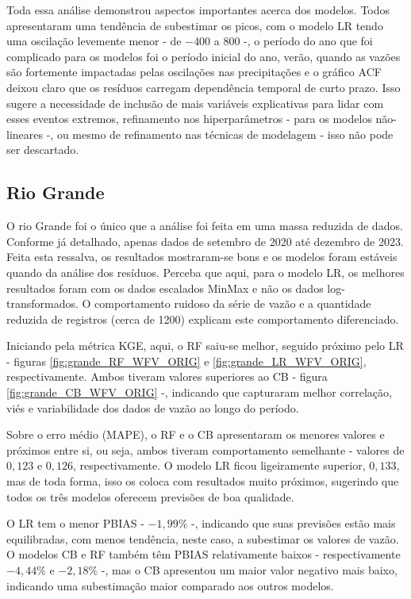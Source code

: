 Toda essa análise demonstrou aspectos importantes acerca dos modelos. Todos apresentaram uma tendência de subestimar os picos, com o modelo LR tendo uma oscilação levemente menor - de $-400$ a $800$ -, o período do ano que foi complicado para os modelos foi o período inicial do ano, verão, quando as vazões são fortemente impactadas pelas oscilações nas precipitações e o gráfico ACF deixou claro que os resíduos carregam dependência temporal de curto prazo. Isso sugere a necessidade de inclusão de mais variáveis explicativas para lidar com esses eventos extremos, refinamento nos hiperparâmetros - para os modelos não-lineares -, ou mesmo de refinamento nas técnicas de modelagem - isso não pode ser descartado.

\clearpage

\subsection{Rio Grande}

O rio Grande foi o único que a análise foi feita em uma massa reduzida de dados. Conforme já detalhado, apenas dados de setembro de 2020 até dezembro de 2023. Feita esta ressalva, os resultados mostraram-se bons e os modelos foram estáveis quando da análise dos resíduos. Perceba que aqui, para o modelo LR, os melhores resultados foram com os dados escalados MinMax e não os dados log-transformados. O comportamento ruidoso da série de vazão e a quantidade reduzida de registros (cerca de 1200) explicam este comportamento diferenciado.

Iniciando pela métrica KGE, aqui, o RF saiu-se melhor, seguido próximo pelo LR - figuras \ref{fig:grande_RF_WFV_ORIG} e \ref{fig:grande_LR_WFV_ORIG}, respectivamente. Ambos tiveram valores superiores ao CB - figura \ref{fig:grande_CB_WFV_ORIG} -, indicando que capturaram melhor correlação, viés e variabilidade dos dados de vazão ao longo do período.

Sobre o erro médio (MAPE), o RF e o CB apresentaram os menores valores e próximos entre si, ou seja, ambos tiveram comportamento semelhante - valores de $0,123$ e $0,126$, respectivamente. O modelo LR ficou ligeiramente superior, $0,133$, mas de toda forma, isso os coloca com resultados muito próximos, sugerindo que todos os três modelos oferecem previsões de boa qualidade.

O LR tem o menor PBIAS - $-1,99\%$ -, indicando que suas previsões estão mais equilibradas, com menos tendência, neste caso, a subestimar os valores de vazão. O modelos CB e RF também têm PBIAS relativamente baixos - respectivamente $-4,44\%$ e $-2,18\%$ -, mas o CB apresentou um maior valor negativo mais baixo, indicando uma subestimação maior comparado aos outros modelos.

